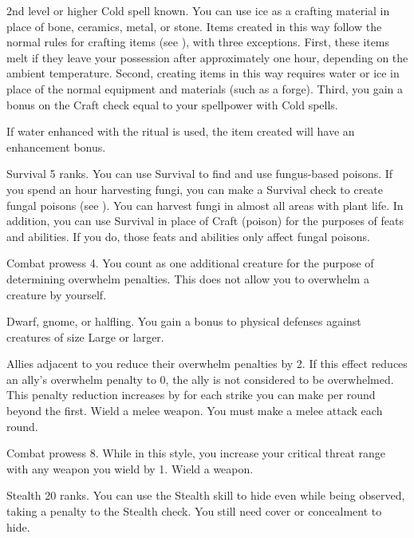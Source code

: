 \featpre 2nd level or higher Cold spell known.
\featben You can use ice as a crafting material in place of bone, ceramics, metal, or stone.
Items created in this way follow the normal rules for crafting items (see ), with three exceptions.
First, these items melt if they leave your possession after approximately one hour, depending on the ambient temperature.
Second, creating items in this way requires water or ice in place of the normal equipment and materials (such as a forge).
Third, you gain a bonus on the Craft check equal to your spellpower with Cold spells.

If water enhanced with the  ritual is used, the item created will have an enhancement bonus.

\featpre Survival 5 ranks.
\featben You can use Survival to find and use fungus-based poisons.
If you spend an hour harvesting fungi, you can make a Survival check to create fungal poisons (see ).
You can harvest fungi in almost all areas with plant life.
In addition, you can use Survival in place of Craft (poison) for the purposes of feats and abilities.
If you do, those feats and abilities only affect fungal poisons.

\featpre Combat prowess 4.
\featben You count as one additional creature for the purpose of determining overwhelm penalties.
This does not allow you to overwhelm a creature by yourself.

\featpres Dwarf, gnome, or halfling.
\featben You gain a  bonus to physical defenses against creatures of size Large or larger.

\featben Allies adjacent to you reduce their overwhelm penalties by 2.
If this effect reduces an ally's overwhelm penalty to 0, the ally is not considered to be overwhelmed.
This penalty reduction increases by  for each strike you can make per round beyond the first.
\stylereq Wield a melee weapon.
You must make a melee attack each round.

\featpre Combat prowess 8.
\featben While in this style, you increase your critical threat range with any weapon you wield by 1.
\stylereq Wield a weapon.

\featpre Stealth 20 ranks.
\featben You can use the Stealth skill to hide even while being observed, taking a  penalty to the Stealth check.
You still need cover or concealment to hide.

